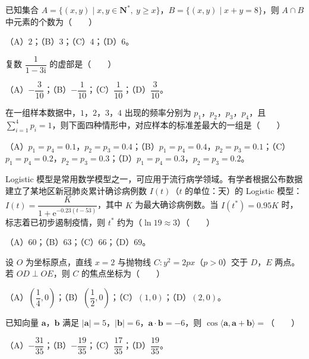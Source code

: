 \begin{question}
已知集合 $A=\{(x,y)\mid x,y\in\mathbf N^*,\ y\geqslant x\}$，$B=\{(x,y)\mid x+y=8\}$，则 $A\cap B$ 中元素的个数为\mbox{（　　）}

（A）$2$；（B）$3$；（C）$4$；（D）$6$。

\end{question}
\begin{question}
复数 $\dfrac1{1-3\mathrm i}$ 的虚部是\mbox{（　　）}

（A）$-\dfrac3{10}$；（B）$-\dfrac1{10}$；（C）$\dfrac1{10}$；（D）$\dfrac3{10}$。

\end{question}
\begin{question}
在一组样本数据中，$1$，$2$，$3$，$4$ 出现的频率分别为 $p_1$，$p_2$，$p_3$，$p_4$，且 $\sum\limits_{i=1}^4p_i=1$，则下面四种情形中，对应样本的标准差最大的一组是\mbox{（　　）}

（A）$p_1=p_4=0.1$，$p_2=p_3=0.4$；（B）$p_1=p_4=0.4$，$p_2=p_3=0.1$；（C）$p_1=p_4=0.2$，$p_2=p_3=0.3$；（D）$p_1=p_4=0.3$，$p_2=p_3=0.2$。

\end{question}
\begin{question}
Logistic 模型是常用数学模型之一，可应用于流行病学领域。有学者根据公布数据建立了某地区新冠肺炎累计确诊病例数 $I(t)$（$t$ 的单位：天）的 Logistic 模型：$I(t)=\dfrac K{1+\mathrm e^{-0.23(t-53)}}$，其中 $K$ 为最大确诊病例数。当 $I(t^*)=0.95K$ 时，标志着已初步遏制疫情，则 $t^*$ 约为（$\ln19\approx3$）\mbox{（　　）}

（A）$60$；（B）$63$；（C）$66$；（D）$69$。

\end{question}
\begin{question}
设 $O$ 为坐标原点，直线 $x=2$ 与抛物线 $C:y^2=2px$（$p>0$）交于 $D$，$E$ 两点。若 $OD\perp OE$，则 $C$ 的焦点坐标为\mbox{（　　）}

（A）$\left(\dfrac14,0\right)$；（B）$\left(\dfrac12,0\right)$；（C）$(1,0)$；（D）$(2,0)$。

\end{question}
\begin{question}
已知向量 $\boldsymbol a$，$\boldsymbol b$ 满足 $|\boldsymbol a|=5$，$|\boldsymbol b|=6$，$\boldsymbol a\cdot\boldsymbol b=-6$，则 $\cos\langle\boldsymbol a,\boldsymbol a+\boldsymbol b\rangle=$\mbox{（　　）}

（A）$-\dfrac{31}{35}$；（B）$-\dfrac{19}{35}$；（C）$\dfrac{17}{35}$；（D）$\dfrac{19}{35}$。

\end{question}
